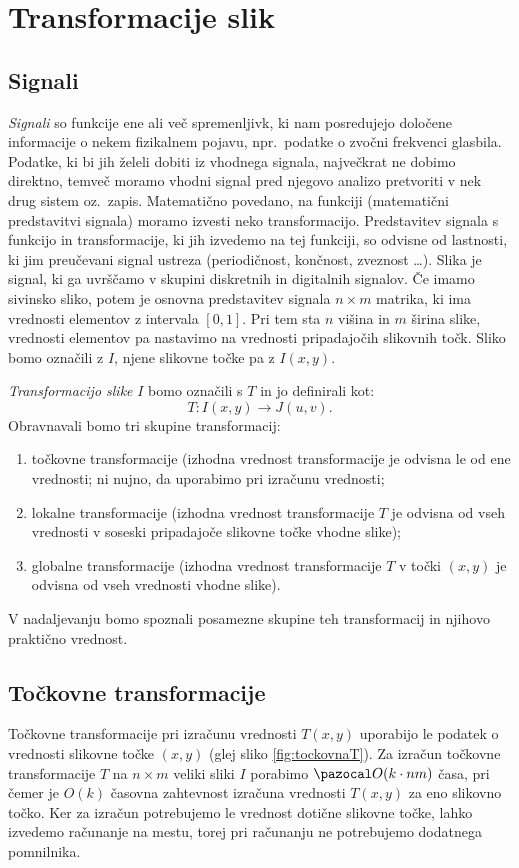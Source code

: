 \section{Transformacije slik}\label{sec:TransformacijeSlik}
%
\subsection{Signali}\label{sec:Signali}
%
\emph{Signali} so funkcije ene ali več spremenljivk, ki nam posredujejo določene informacije o nekem fizikalnem pojavu, npr.\ podatke o zvočni frekvenci glasbila. Podatke, ki bi jih želeli dobiti iz vhodnega signala, največkrat ne dobimo direktno, temveč moramo vhodni signal pred njegovo analizo pretvoriti v nek drug sistem oz.\ zapis. Matematično povedano, na funkciji (matematični predstavitvi signala) moramo izvesti neko transformacijo. Predstavitev signala s funkcijo in transformacije, ki jih izvedemo na tej funkciji, so odvisne od lastnosti, ki jim preučevani signal ustreza (periodičnost, končnost, zveznost \ldots).
%
Slika je signal, ki ga uvrščamo v skupini diskretnih in digitalnih signalov. Če imamo sivinsko sliko, potem je osnovna predstavitev signala $n \times m$ matrika, ki ima vrednosti elementov z intervala $[0, 1]$. Pri tem sta $n$ višina in $m$ širina slike, vrednosti elementov pa nastavimo na vrednosti pripadajočih slikovnih točk. Sliko bomo označili z $I$, njene slikovne točke pa z $I(x, y)$.

\emph{Transformacijo slike} $I$ bomo označili s $T$ in jo definirali kot:
%
$$T: I(x, y) \to J(u, v).$$
%
Obravnavali bomo tri skupine transformacij:
%
\begin{enumerate}
\item točkovne transformacije (izhodna vrednost transformacije je odvisna le od ene vrednosti; ni nujno, da uporabimo pri izračunu vrednosti; 
\item lokalne transformacije (izhodna vrednost transformacije $T$ je odvisna od vseh vrednosti v soseski pripadajoče slikovne točke vhodne slike);
\item globalne transformacije (izhodna vrednost transformacije $T$ v točki $(x, y)$ je odvisna od vseh vrednosti vhodne slike).
\end{enumerate}
%
V nadaljevanju bomo spoznali posamezne skupine teh transformacij in njihovo praktično vrednost.
%
\subsection{Točkovne transformacije}
%
Točkovne transformacije pri izračunu vrednosti $T(x, y)$ uporabijo le podatek o vrednosti slikovne točke $(x, y)$ (glej sliko \ref{fig:tockovnaT}). Za izračun točkovne transformacije $T$ na $n \times m$ veliki sliki $I$ porabimo $\O(k\cdot nm)$ časa, pri čemer je $O(k)$ časovna zahtevnost izračuna vrednosti $T(x, y)$ za eno slikovno točko. Ker za izračun potrebujemo le vrednost dotične slikovne točke, lahko izvedemo računanje na mestu, torej pri računanju ne potrebujemo dodatnega pomnilnika.

